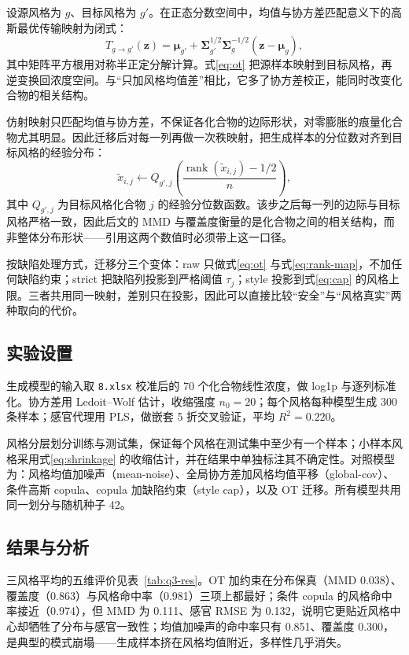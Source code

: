 ﻿\documentclass[UTF8,a4paper,zihao=-4]{ctexart}
\numberwithin{figure}{section}
\numberwithin{table}{section}
\numberwithin{equation}{section}
\newcommand{\file}[1]{\texttt{#1}}
\newcommand{\bSigma}{\bm{\Sigma}}
\begin{document}
设源风格为 $g$、目标风格为 $g'$。在正态分数空间中，均值与协方差匹配意义下的高斯最优传输映射\cite{peyre2019}为闭式：
\begin{equation}
T_{g\to g'}(\bm{z})=\bm{\mu}_{g'}+\bSigma_{g'}^{1/2}\bSigma_g^{-1/2}\left(\bm{z}-\bm{\mu}_g\right),
\label{eq:ot}
\end{equation}
其中矩阵平方根用对称半正定分解计算。式\eqref{eq:ot} 把源样本映射到目标风格，再逆变换回浓度空间。与“只加风格均值差”相比，它多了协方差校正，能同时改变化合物的相关结构。

仿射映射只匹配均值与协方差，不保证各化合物的边际形状，对零膨胀的痕量化合物尤其明显。因此迁移后对每一列再做一次秩映射，把生成样本的分位数对齐到目标风格的经验分布：
\begin{equation}
\tilde{x}_{i,j}\leftarrow Q_{g',j}\left(\frac{\operatorname{rank}(\tilde{x}_{i,j})-1/2}{n}\right),
\label{eq:rank-map}
\end{equation}
其中 $Q_{g',j}$ 为目标风格化合物 $j$ 的经验分位数函数。该步之后每一列的边际与目标风格严格一致，因此后文的 MMD 与覆盖度衡量的是化合物之间的相关结构，而非整体分布形状——引用这两个数值时必须带上这一口径。

按缺陷处理方式，迁移分三个变体：raw 只做式\eqref{eq:ot} 与式\eqref{eq:rank-map}，不加任何缺陷约束；strict 把缺陷列投影到严格阈值 $\tau_j$；style 投影到式\eqref{eq:cap} 的风格上限。三者共用同一映射，差别只在投影，因此可以直接比较“安全”与“风格真实”两种取向的代价。

\subsection{实验设置}

生成模型的输入取 \file{8.xlsx} 校准后的 70 个化合物线性浓度，做 log1p 与逐列标准化。协方差用 Ledoit--Wolf 估计，收缩强度 $n_0=20$；每个风格每种模型生成 300 条样本；感官代理用 PLS，做嵌套 5 折交叉验证，平均 $R^2=0.220$。

风格分层划分训练与测试集，保证每个风格在测试集中至少有一个样本；小样本风格采用式\eqref{eq:shrinkage} 的收缩估计，并在结果中单独标注其不确定性。对照模型为：风格均值加噪声（mean-noise）、全局协方差加风格均值平移（global-cov）、条件高斯 copula、copula 加缺陷约束（style cap），以及 OT 迁移。所有模型共用同一划分与随机种子 42。

\subsection{结果与分析}

三风格平均的五维评价见表~\ref{tab:q3-res}。OT 加约束在分布保真（MMD 0.038）、覆盖度（0.863）与风格命中率（0.981）三项上都最好；条件 copula 的风格命中率接近（0.974），但 MMD 为 0.111、感官 RMSE 为 0.132，说明它更贴近风格中心却牺牲了分布与感官一致性；均值加噪声的命中率只有 0.851、覆盖度 0.300，是典型的模式崩塌——生成样本挤在风格均值附近，多样性几乎消失。
\end{document}
